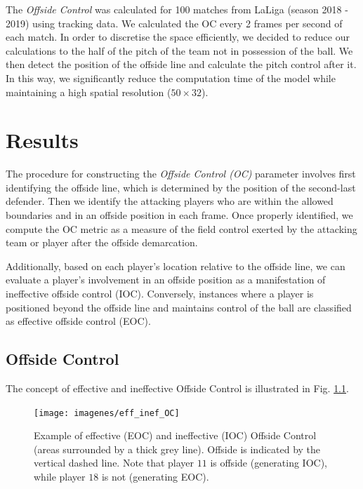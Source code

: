 \documentclass[
  10pt,
  twoside,nohyper]{book}
\begin{document}
The \emph{Offside Control} was calculated for 100 matches from LaLiga (season 2018 - 2019) using tracking data. We calculated the OC every 2 frames per second of each match. In order to discretise the space efficiently, we decided to reduce our calculations to the half of the pitch of the team not in possession of the ball. We then detect the position of the offside line and calculate the pitch control after it. In this way, we significantly reduce the computation time of the model while maintaining a high spatial resolution (\(50 \times 32\)).

\chapter{Results}\label{results}

The procedure for constructing the \emph{Offside Control (OC)} parameter involves first identifying the offside line, which is determined by the position of the second-last defender. Then we identify the attacking players who are within the allowed boundaries and in an offside position in each frame. Once properly identified, we compute the OC metric as a measure of the field control exerted by the attacking team or player after the offside demarcation.

Additionally, based on each player's location relative to the offside line, we can evaluate a player's involvement in an offside position as a manifestation of ineffective offside control (IOC). Conversely, instances where a player is positioned beyond the offside line and maintains control of the ball are classified as effective offside control (EOC).

\section{Offside Control}\label{offside-control}

The concept of effective and ineffective Offside Control is illustrated in Fig. \ref{fig:eff}.

\begin{figure}[H]

{\centering \texttt{[image: imagenes/eff\_inef\_OC]} 

}

\caption{Example of effective (EOC) and ineffective (IOC) Offside Control (areas surrounded by a thick grey line). Offside is indicated by the vertical dashed line. Note that player $11$ is offside (generating IOC), while player $18$ is not (generating EOC).}\label{fig:eff}
\end{figure}
\end{document}
